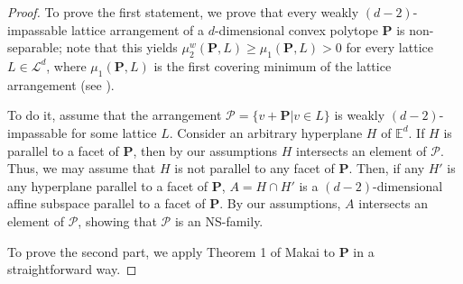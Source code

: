 \documentclass[12pt]{article}
\newcommand{\Ee}{{\mathbb E}}
\begin{document}
\begin{proof}
To prove the first statement, we prove that every weakly $(d-2)$-impassable lattice arrangement of a $d$-dimensional convex polytope $\mathbf{P}$ is non-separable; note that this yields $\mu_2^w (\mathbf{P}, L) \geq \mu_1 (\mathbf{P}, L)>0$ for every lattice $L \in \mathcal{L}^d$, where $\mu_1 (\mathbf{P}, L)$ is the first covering minimum of the lattice arrangement (see \cite{KaLo}).

To do it, assume that the arrangement $\mathcal{P}= \{ v + \mathbf{P} | v \in L \}$ is weakly $(d-2)$-impassable for some lattice $L$. Consider an arbitrary hyperplane $H$ of $\Ee^d$. If $H$ is parallel to a facet of $\mathbf{P}$, then by our assumptions $H$ intersects an element of $\mathcal{P}$. Thus, we may assume that $H$ is not parallel to any facet of $\mathbf{P}$. Then, if any $H'$ is any hyperplane parallel to a facet of $\mathbf{P}$, $A=H \cap H'$ is a $(d-2)$-dimensional affine subspace parallel to a facet of $\mathbf{P}$. By our assumptions, $A$ intersects an element of $\mathcal{P}$, showing that $\mathcal{P}$ is an NS-family.

To prove the second part, we apply Theorem 1 of Makai \cite{Ma78} to $\mathbf{P}$ in a straightforward way.
\end{proof}
\end{document}
